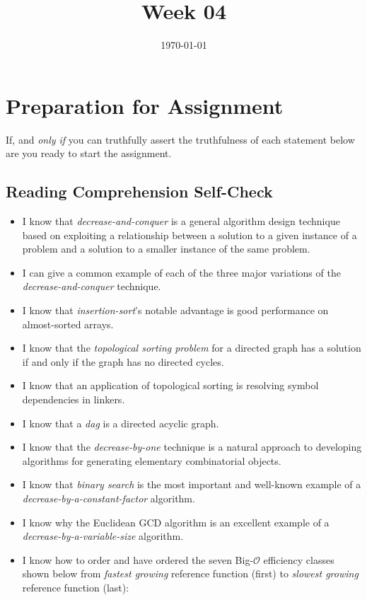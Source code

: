 \documentclass[12pt]{amsart}
\title{Week 04}
\date{\today}
\begin{document}
\maketitle

\section{Preparation for Assignment}
If, and \textit{only if} you can truthfully assert the truthfulness of each statement below are you ready to start the assignment.
\subsection {Reading Comprehension Self-Check}
\begin{itemize}
\item  I know that \textit{decrease-and-conquer} is a general algorithm design technique based on exploiting a relationship between a solution to a given instance of a problem and a solution to a smaller instance of the same problem.
\item  I can give a common example of each of the three major variations of the \textit{decrease-and-conquer} technique.
\item  I know that \textit{insertion-sort}'s notable advantage is good performance on almost-sorted arrays.
\item  I know that the \textit{topological sorting problem} for a directed graph has a solution if and only if the graph has no directed cycles.
\item  I know that an application of topological sorting is resolving symbol dependencies in linkers.
\item  I know that a \textit{dag} is a directed acyclic graph.
\item  I know that the \textit{decrease-by-one} technique is a natural approach to developing algorithms for generating elementary combinatorial objects.
\item  I know that \textit{binary search} is the most important and well-known example of a \textit{decrease-by-a-constant-factor} algorithm.
\item  I know why the Euclidean GCD algorithm is an excellent example of a \textit{decrease-by-a-variable-size} algorithm.
\item  I know how to order and have ordered the seven Big-$\mathcal{O}$ efficiency classes shown below from \textit{fastest growing} reference function (first) to \textit{slowest growing} reference function (last):

\end{itemize}
\end{document}
